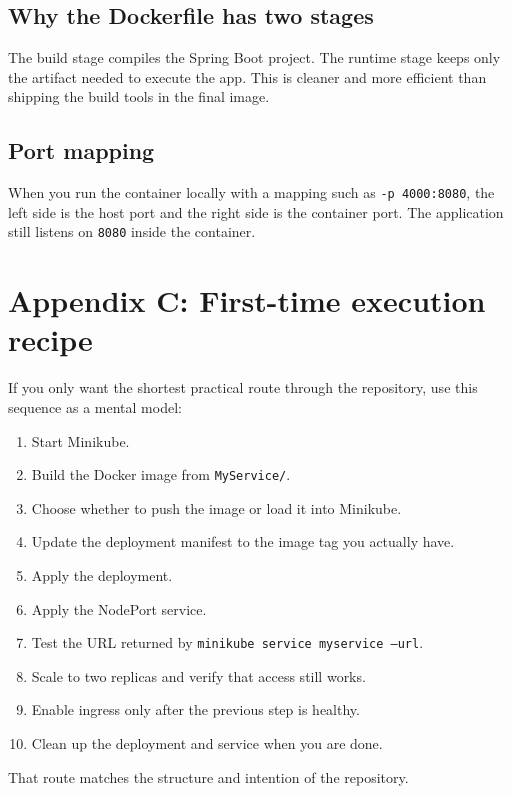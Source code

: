 \documentclass[11pt,a4paper]{article}
\newcommand{\pathitem}[1]{\texorpdfstring{\nolinkurl{#1}}{#1}}
\newcommand{\cmd}[1]{\texttt{#1}}
\begin{document}
\subsection{Why the Dockerfile has two stages}

The build stage compiles the Spring Boot project. The runtime stage keeps only the artifact needed to execute the app. This is cleaner and more efficient than shipping the build tools in the final image.

\subsection{Port mapping}

When you run the container locally with a mapping such as \cmd{-p 4000:8080}, the left side is the host port and the right side is the container port. The application still listens on \cmd{8080} inside the container.

\section{Appendix C: First-time execution recipe}

If you only want the shortest practical route through the repository, use this sequence as a mental model:

\begin{enumerate}
\item Start Minikube.
\item Build the Docker image from \pathitem{MyService/}.
\item Choose whether to push the image or load it into Minikube.
\item Update the deployment manifest to the image tag you actually have.
\item Apply the deployment.
\item Apply the NodePort service.
\item Test the URL returned by \cmd{minikube service myservice --url}.
\item Scale to two replicas and verify that access still works.
\item Enable ingress only after the previous step is healthy.
\item Clean up the deployment and service when you are done.
\end{enumerate}

That route matches the structure and intention of the repository.
\end{document}
